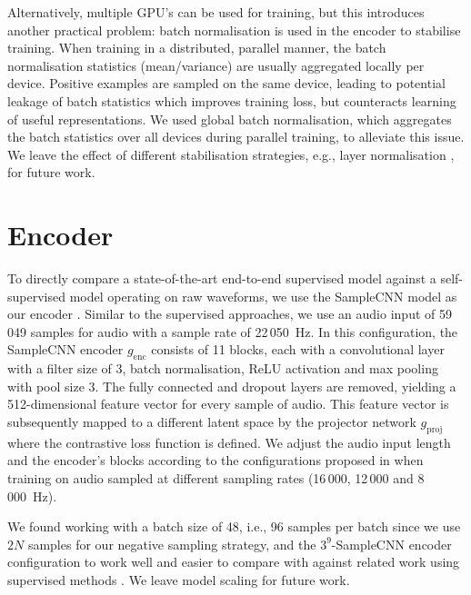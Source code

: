 Alternatively, multiple GPU's can be used for training, but this introduces another practical problem: batch normalisation \cite{batch_normalisation} is used in the encoder to stabilise training.
When training in a distributed, parallel manner, the batch normalisation statistics (mean/variance) are usually aggregated locally per device.
Positive examples are sampled on the same device, leading to potential leakage of batch statistics which improves training loss, but counteracts learning of useful representations.
We used global batch normalisation, which aggregates the batch statistics over all devices during parallel training, to alleviate this issue. We leave the effect of different stabilisation strategies, e.g., layer normalisation \cite{henaff2019data}, for future work.


\section{Encoder}
To directly compare a state-of-the-art end-to-end supervised model against a self-supervised model operating on raw waveforms, we use the SampleCNN model as our encoder \cite{lee2018samplecnn}.
Similar to the supervised approaches, we use an audio input of 59\,049 samples for audio with a sample rate of 22\,050~Hz.
In this configuration, the SampleCNN encoder $g_{\mathrm{enc}}$ consists of 11 blocks, each with a convolutional layer with a filter size of 3, batch normalisation, ReLU activation and max pooling with pool size 3.
The fully connected and dropout layers are removed, yielding a 512-dimensional feature vector for every sample of audio.
This feature vector is subsequently mapped to a different latent space by the projector network $g_{\mathrm{proj}}$ where the contrastive loss function is defined.
We adjust the audio input length and the encoder's blocks according to the configurations proposed in \cite{lee2018samplecnn} when training on audio sampled at different sampling rates (16\,000, 12\,000 and 8\,000~Hz).

We found working with a batch size of 48, i.e., 96 samples per batch since we use $2N$ samples for our negative sampling strategy, and the $3^9$-SampleCNN encoder configuration to work well and easier to compare with against related work using supervised methods \cite{lee2018samplecnn, dieleman2014end,pons_end--end_2017}.
We leave model scaling for future work.



